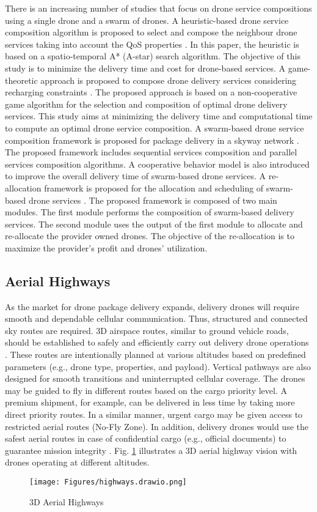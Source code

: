 \documentclass[conference]{IEEEtran}
\begin{document}
There is an increasing number of studies that focus on drone service compositions using a single drone and a swarm of drones. A heuristic-based drone service composition algorithm is proposed to select and compose the neighbour drone services taking into account the QoS properties \cite{shahzaad2019composing}. In this paper, the heuristic is based on a spatio-temporal A* (A-star) search algorithm. The objective of this study is to minimize the delivery time and cost for drone-based services. A game-theoretic approach is proposed to compose drone delivery services considering recharging constraints \cite{9284115}. The proposed approach is based on a non-cooperative game algorithm for the selection and composition of optimal drone delivery services. This study aims at minimizing the delivery time and computational time to compute an optimal drone service composition. A swarm-based drone service composition framework is proposed for package delivery in a skyway network \cite{alkouz2020swarm}. The proposed framework includes sequential services composition and parallel services composition algorithms. A cooperative behavior model is also introduced to improve the overall delivery time of swarm-based drone services. A re-allocation framework is proposed for the allocation and scheduling of swarm-based drone services \cite{alkouz2021reinforcemnt}. The proposed framework is composed of two main modules. The first module performs the composition of swarm-based delivery services. The second module uses the output of the first module to allocate and re-allocate the provider owned drones. The objective of the re-allocation is to maximize the provider's profit and drones' utilization.

\subsection{Aerial Highways}
As the market for drone package delivery expands, delivery drones will require smooth and dependable cellular communication. Thus, structured and connected sky routes are required. 3D airspace routes, similar to ground vehicle roads, should be established to safely and efficiently carry out delivery drone operations \cite{cherif20213d}. These routes are intentionally planned at various altitudes based on predefined parameters (e.g., drone type, properties, and payload). Vertical pathways are also designed for smooth transitions and uninterrupted cellular coverage. The drones may be guided to fly in different routes based on the cargo priority level. A premium shipment, for example, can be delivered in less time by taking more direct priority routes. In a similar manner, urgent cargo may be given access to restricted  aerial routes (No-Fly Zone). In addition, delivery drones would use the safest aerial routes in case of confidential cargo (e.g., official documents) to guarantee mission integrity \cite{cherif20213d}. Fig. \ref{highway} illustrates a 3D aerial highway vision with drones operating at different altitudes.
\begin{figure} [h]
    \centering
    \texttt{[image: Figures/highways.drawio.png]}
    \caption{3D Aerial Highways}
    \label{highway}
\end{figure}
\end{document}
